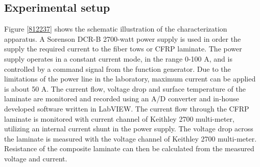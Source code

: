 \subsection{Experimental setup}

Figure \ref{812237}  shows the schematic illustration of the characterization apparatus. A Sorenson DCR-B 2700-watt power supply is used in order the supply the required current to the fiber tows or CFRP laminate. The power supply operates in a constant current mode, in the range 0-100 A, and is controlled by a command signal from the function generator. Due to the limitations of the power line in the laboratory, maximum current can be applied is about 50 A. The current flow, voltage drop and surface temperature of the laminate are monitored and recorded using an A/D converter and in-house developed software written in LabVIEW. The current flow through the CFRP laminate is monitored with current channel of Keithley 2700 multi-meter, utilizing an internal current shunt in the power supply. The voltage drop across the laminate is measured with the voltage channel of Keithley 2700 multi-meter. Resistance of the composite laminate can then be calculated from the measured voltage and current.